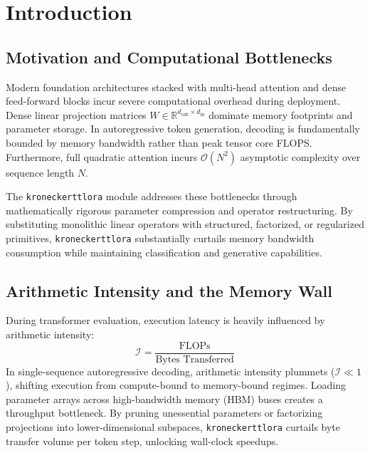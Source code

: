 \section{Introduction}

\subsection{Motivation and Computational Bottlenecks}
Modern foundation architectures stacked with multi-head attention and dense feed-forward blocks incur severe computational overhead during deployment. Dense linear projection matrices $W \in \mathbb{R}^{d_{\text{out}} \times d_{\text{in}}}$ dominate memory footprints and parameter storage. In autoregressive token generation, decoding is fundamentally bounded by memory bandwidth rather than peak tensor core FLOPS. Furthermore, full quadratic attention incurs $\mathcal{O}(N^2)$ asymptotic complexity over sequence length $N$.

The \texttt{kroneckerttlora} module addresses these bottlenecks through mathematically rigorous parameter compression and operator restructuring. By substituting monolithic linear operators with structured, factorized, or regularized primitives, \texttt{kroneckerttlora} substantially curtails memory bandwidth consumption while maintaining classification and generative capabilities.

\subsection{Arithmetic Intensity and the Memory Wall}
During transformer evaluation, execution latency is heavily influenced by arithmetic intensity:
\[
\mathcal{I} = \frac{\text{FLOPs}}{\text{Bytes Transferred}}
\]
In single-sequence autoregressive decoding, arithmetic intensity plummets ($\mathcal{I} \ll 1$), shifting execution from compute-bound to memory-bound regimes. Loading parameter arrays across high-bandwidth memory (HBM) buses creates a throughput bottleneck. By pruning unessential parameters or factorizing projections into lower-dimensional subspaces, \texttt{kroneckerttlora} curtails byte transfer volume per token step, unlocking wall-clock speedups.

